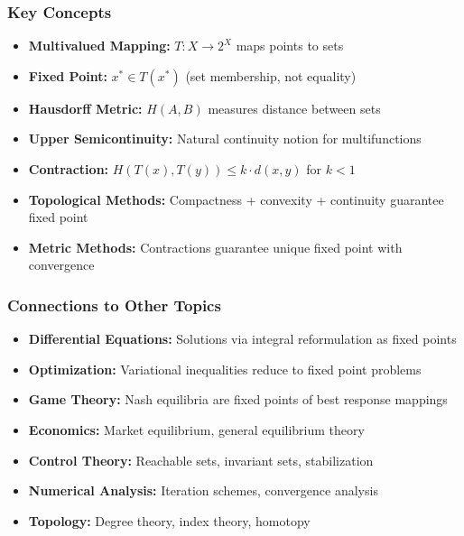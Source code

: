 \documentclass[aspectratio=169,10pt]{beamer}
\begin{document}
\begin{frame}
\frametitle{Key Concepts}

\begin{itemize}
    \item \textbf{Multivalued Mapping:} $T: X \to 2^X$ maps points to sets

    \item \textbf{Fixed Point:} $x^* \in T(x^*)$ (set membership, not equality)

    \item \textbf{Hausdorff Metric:} $H(A,B)$ measures distance between sets

    \item \textbf{Upper Semicontinuity:} Natural continuity notion for multifunctions

    \item \textbf{Contraction:} $H(T(x), T(y)) \leq k \cdot d(x,y)$ for $k < 1$

    \item \textbf{Topological Methods:} Compactness + convexity + continuity guarantee fixed point

    \item \textbf{Metric Methods:} Contractions guarantee unique fixed point with convergence
\end{itemize}

\end{frame}

\begin{frame}
\frametitle{Connections to Other Topics}

\begin{itemize}
    \item \textbf{Differential Equations:} Solutions via integral reformulation as fixed points

    \item \textbf{Optimization:} Variational inequalities reduce to fixed point problems

    \item \textbf{Game Theory:} Nash equilibria are fixed points of best response mappings

    \item \textbf{Economics:} Market equilibrium, general equilibrium theory

    \item \textbf{Control Theory:} Reachable sets, invariant sets, stabilization

    \item \textbf{Numerical Analysis:} Iteration schemes, convergence analysis

    \item \textbf{Topology:} Degree theory, index theory, homotopy
\end{itemize}

\end{frame}
\end{document}
